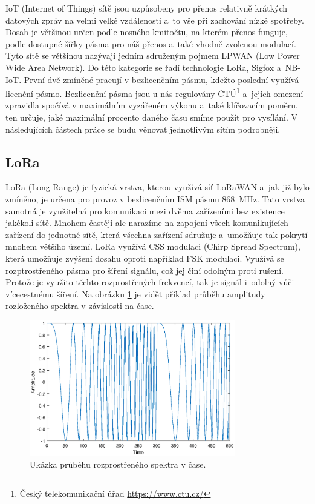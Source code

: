 IoT (Internet of Things) sítě jsou uzpůsobeny pro přenos relativně krátkých datových zpráv na velmi velké vzdálenosti a~to vše při zachování nízké spotřeby. Dosah je většinou určen podle nosného kmitočtu, na kterém přenos funguje, podle dostupné šířky pásma pro náš přenos a~také vhodně zvolenou modulací. Tyto sítě se většinou nazývají jedním sdruženým pojmem LPWAN (Low Power Wide Area Network). Do této kategorie se řadí technologie LoRa, Sigfox a~NB-IoT. První dvě zmíněné pracují v bezlicenčním pásmu, kdežto poslední využívá licenční pásmo. Bezlicenční pásma jsou u nás regulovány ČTÚ\footnote{Český telekomunikační úřad \url{https://www.ctu.cz/}} a~jejich omezení zpravidla spočívá v maximálním vyzářeném výkonu a~také klíčovacím poměru, ten určuje, jaké maximální procento daného času smíme použít pro vysílání. V následujících částech práce se budu věnovat jednotlivým sítím podrobněji.

\subsection{LoRa}

LoRa (Long Range) je fyzická vrstva, kterou využívá síť LoRaWAN a~jak již bylo zmíněno, je určena pro provoz v bezlicenčním ISM pásmu \SI{868}{\mega\hertz}. Tato vrstva samotná je využitelná pro komunikaci mezi dvěma zařízeními bez existence jakékoli sítě. Mnohem častěji ale narazíme na zapojení všech komunikujících zařízení do jednotné sítě, která všechna zařízení sdružuje a~umožňuje tak pokrytí mnohem většího území. LoRa využívá CSS modulaci (Chirp Spread Spectrum), která umožňuje zvýšení dosahu oproti například FSK modulaci. Využívá se rozptrostřeného pásma pro šíření signálu, což jej činí odolným proti rušení. Protože je využito těchto rozprostřených frekvencí, tak je signál i~odolný vůči vícecestnému šíření. Na obrázku \ref{fig_chirpSpreadSpectrum} je vidět příklad průběhu amplitudy rozloženého spektra v závislosti na čase.

\begin{figure}
    \centering
    \includegraphics[width=0.8\textwidth]{obrazky/ChirpSpreadSpectrum.eps}
    \caption{Ukázka průběhu rozprostřeného spektra v čase.}
    \label{fig_chirpSpreadSpectrum}
\end{figure}

